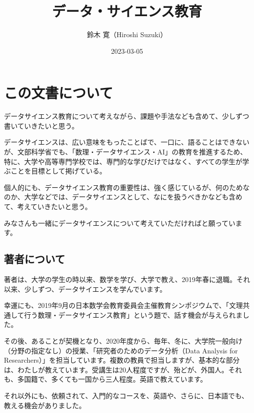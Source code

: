 \documentclass[
]{bxjsbook}
\title{データ・サイエンス教育}
\author{鈴木 寛（Hiroshi Suzuki）}
\date{2023-03-05}
\theoremstyle{definition}
\theoremstyle{definition}
\theoremstyle{definition}
\theoremstyle{definition}
\theoremstyle{remark}
\begin{document}
\maketitle

{
\setcounter{tocdepth}{2}
\tableofcontents
}
\hypertarget{ux3053ux306eux6587ux66f8ux306bux3064ux3044ux3066}{%
\section*{この文書について}\label{ux3053ux306eux6587ux66f8ux306bux3064ux3044ux3066}}

データサイエンス教育について考えながら、課題や手法なども含めて、少しずつ書いていきたいと思う。

データサイエンスは、広い意味をもったことばで、一口に、語ることはできないが、文部科学省でも、「数理・データサイエンス・AI」の教育を推進するため、特に、大学や高等専門学校では、専門的な学びだけではなく、すべての学生が学ぶことを目標として掲げている。

個人的にも、データサイエンス教育の重要性は、強く感じているが、何のためなのか、大学などでは、データサイエンスとして、なにを扱うべきかなども含めて、考えていきたいと思う。

みなさんも一緒にデータサイエンスについて考えていただければと願っています。

\hypertarget{ux8457ux8005ux306bux3064ux3044ux3066}{%
\subsection*{著者について}\label{ux8457ux8005ux306bux3064ux3044ux3066}}

著者は、大学の学生の時以来、数学を学び、大学で教え、2019年春に退職。それ以来、少しずつ、データサイエンスを学んでいます。

幸運にも、2019年9月の日本数学会教育委員会主催教育シンポジウムで、「文理共通して行う数理・データサイエンス教育」という題で、話す機会が与えられました。

その後、あることが契機となり、2020年度から、毎年、冬に、大学院一般向け（分野の指定なし）の授業、「研究者のためのデータ分析（Data Analysis for Researchers）」を担当しています。複数の教員で担当しますが、基本的な部分は、わたしが教えています。受講生は20人程度ですが、殆どが、外国人。それも、多国籍で、多くても一国から三人程度。英語で教えています。

それ以外にも、依頼されて、入門的なコースを、英語や、さらに、日本語でも、教える機会がありました。
\end{document}
